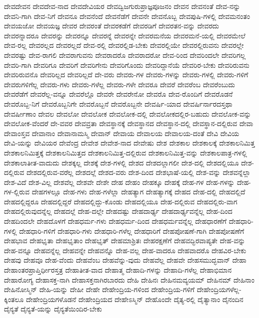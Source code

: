 {ದೇವದೇವನ
ದೇವದೇವ-ನಾದ
ದೇವದೇವಿಯರ
ದೇವದ್ವಿಜಗುರುಪ್ರಾಜ್ಞಪೂಜನಂ
ದೇವನ
ದೇವನಂತೆ
ದೇವ-ನನ್ನು
ದೇವನಿ-ಗಾಗಿ
ದೇವ-ನಿಗೆ
ದೇವನೂ
ದೇವನೆಂದೆ
ದೇವನೆಡೆಗೆ
ದೇವನೇ
ದೇವನೊಬ್ಬ
ದೇವಪುಷಿ-ಗಳಲ್ಲಿ
ದೇವಮನಂತಂ
ದೇವಯಜೋ
ದೇವಯಜ್ಞ
ದೇವರ
ದೇವರಂತೆ
ದೇವರಕಡೆಗೆ
ದೇವರಡಿಗೆ
ದೇವರತನ-ವನ್ನು
ದೇವರದು
ದೇವರನ್ನಾದರೂ
ದೇವರನ್ನು
ದೇವರನ್ನೂ
ದೇವರನ್ನೆ
ದೇವರನ್ನೇ
ದೇವರಮನೆಯ
ದೇವರಮನೆ-ಯಲ್ಲಿ
ದೇವರಮೇಲೆ
ದೇವ-ರಲ್ಲ
ದೇವರಲ್ಲದ
ದೇವರಲ್ಲದೆ
ದೇವ-ರಲ್ಲಿ
ದೇವರಲ್ಲಿಡ-ಬೇಕು
ದೇವರಲ್ಲಿಯೇ
ದೇವರಲ್ಲಿರುವನು
ದೇವರಲ್ಲೇ
ದೇವರಷ್ಟು
ದೇವ-ರಾಗಲಿ
ದೇವರಾಗುವನು
ದೇವರಾದರೊ
ದೇವರಾದರೋ
ದೇವ-ರಿಂದ
ದೇವರಿಂದಲೇ
ದೇವರಿಗಲ್ಲ
ದೇವರಿ-ಗಾಗಿ
ದೇವರಿಗೂ
ದೇವರಿಗೆ
ದೇವರಿಗೇನು
ದೇವರಿಗೊಂದು
ದೇವರಿದ್ದಾನೆಯೆ
ದೇವರಿರ-ಬೇಕು
ದೇವರಿರುವನು
ದೇವರಿರುವನೊ
ದೇವರಿಲ್ಲದ
ದೇವರಿಲ್ಲದೆ
ದೇ-ವರು
ದೇವರು-ಗಳ
ದೇವರು-ಗಳನ್ನು
ದೇವರು-ಗಳಲ್ಲಿ
ದೇವರು-ಗಳಿಗೆ
ದೇವರುಗಳಿಗೆಲ್ಲ
ದೇವರು-ಗಳು
ದೇವರು-ಗಳೆಲ್ಲ
ದೇವರು-ಗಳೇ
ದೇವರೂ
ದೇವರೆ
ದೇವರೆಂಬ
ದೇವರೆಂಬುದು
ದೇವರೆಡೆಗೆ
ದೇವರೆಲ್ಲ-ವನ್ನೂ
ದೇವರೆಲ್ಲೊ
ದೇವರೇ
ದೇವರೇನೋ
ದೇವರೊ
ದೇವ-ರೊಂದಿಗೆ
ದೇವರೊಡನೆ
ದೇವರೊಬ್ಬ-ನಿಗೆ
ದೇವರೊಬ್ಬನಿಗೇ
ದೇವರೊಬ್ಬನೆ
ದೇವರೊಬ್ಬನೇ
ದೇವರ್ಷಿ-ಯಾದ
ದೇವರ್ಷಿರ್ನಾರದಸ್ತಥಾ
ದೇವರ್ಷೀಣಾಂ
ದೇವಲ
ದೇವಲೋ
ದೇವಲೋಕ
ದೇವಲೋಕ-ದಲ್ಲಿ
ದೇವಲೋಕದಲ್ಲಿರ-ಬಹುದು
ದೇವಲೋಕ-ವನ್ನು
ದೇವಲೋಕ-ವೆಂದರೆ
ದೇ-ವವರ
ದೇವವ್ರತಾ
ದೇವಸ್ಥಾನಕ್ಕೆ
ದೇವಸ್ಥಾನದ
ದೇವಸ್ಥಾನ-ದಲ್ಲಿ
ದೇವಸ್ಥಾನ-ದಲ್ಲಿರುವ
ದೇವಾ
ದೇವಾಂಸ್ತವ
ದೇವಾನಾಂ
ದೇವಾನಾಮಸ್ಮಿ
ದೇವಾನ್
ದೇವಾಯ
ದೇವಾಲಯ
ದೇವಾಲಯ-ದಂತೆ
ದೇವಿ
ದೇವಿಯ
ದೇವಿ-ಯನ್ನು
ದೇವಿಯರ
ದೇವೆಂದ್ರ
ದೇವೇಶ
ದೇವೇಶ-ನಾದ
ದೇವೇಷು
ದೇಶ
ದೇಶಕಾಲ
ದೇಶಕಾಲಕ್ಕೆ
ದೇಶಕಾಲನಿಮಿತ್ತ
ದೇಶಕಾಲನಿಮಿತ್ತಕ್ಕೆ
ದೇಶಕಾಲನಿಮಿತ್ತದ
ದೇಶಕಾಲನಿಮಿತ್ತ-ದಲ್ಲಿರುವ
ದೇಶಕಾಲನಿಮಿತ್ತ-ವನ್ನು
ದೇಶಕಾಲಪಾತ್ರ-ಗಳಲ್ಲಿ
ದೇಶಕಾಲಾತೀತ-ವಾದುದು
ದೇಶಕ್ಕಲ್ಲ
ದೇಶಕ್ಕೆ
ದೇಶ-ಗಳಲ್ಲಿ
ದೇಶದ
ದೇಶದಲ್ಲಾಗಲೀ
ದೇಶ-ದಲ್ಲಿ
ದೇಶದಲ್ಲಿಯೂ
ದೇಶ-ದಲ್ಲಿರುವ
ದೇಶದಲ್ಲಿರುವ-ವರೆಲ್ಲ
ದೇಶದಲ್ಲೆ
ದೇಶದ-ವರು
ದೇಶ-ದಿಂದ
ದೇಶಭಾಷೆ-ಯಲ್ಲಿ
ದೇಶ-ವನ್ನು
ದೇಶವನ್ನೆಲ್ಲಾ
ದೇಶ-ವಿದೆ
ದೇಶ-ವಿಲ್ಲ
ದೇಶವೆಲ್ಲ
ದೇಶವೇ
ದೇಶೇ
ದೇಹ
ದೇಹಂ
ದೇಹಕ್ಕೂ
ದೇಹಕ್ಕೆ
ದೇಹ-ಗಳ
ದೇಹ-ಗಳನ್ನು
ದೇಹ-ಗಳ-ಲ್ಲಿರುವ
ದೇಹಗಳಲ್ಲೂ
ದೇಹ-ಗಳು
ದೇಹ-ಗಳೆಲ್ಲಾ
ದೇಹತ್ಯಾಗ
ದೇಹತ್ಯಾಗಕ್ಕೆ
ದೇಹದ
ದೇಹ-ದಲ್ಲಿ
ದೇಹದಲ್ಲಿದೆ
ದೇಹದಲ್ಲಿದ್ದರೂ
ದೇಹದಲ್ಲಿದ್ದರೆ
ದೇಹದಲ್ಲಿದ್ದು-ಕೊಂಡು
ದೇಹದಲ್ಲಿಯೂ
ದೇಹ-ದಲ್ಲಿರುವ
ದೇಹದಲ್ಲಿರು-ವಾಗ
ದೇಹದಲ್ಲಿರುವುದನ್ನೆಲ್ಲ
ದೇಹದಲ್ಲೆ
ದೇಹ-ದಲ್ಲೇ
ದೇಹದಷ್ಟು
ದೇಹದಾರ್ಢ್ಯ
ದೇಹದಾರ್ಢ್ಯವನ್ನೆಲ್ಲ
ದೇಹ-ದಿಂದ
ದೇಹದಿಂದಲೇ
ದೇಹದೊಳಗೆ
ದೇಹಧರ್ಮ-ಗಳು
ದೇಹಧರ್ಮ-ದಿಂದ
ದೇಹಧರ್ಮವನ್ನೆಲ್ಲ
ದೇಹಧಾರಣೆಗೆ
ದೇಹಧಾರಿ-ಗಳಲ್ಲಿ
ದೇಹಧಾರಿ-ಗಳಿಗೆ
ದೇಹಧಾರಿ-ಗಳು
ದೇಹಧಾರಿ-ಗಳೆಲ್ಲ
ದೇಹಧಾರಿಗೆ
ದೇಹಪೋಷಣೆ-ಗಾಗಿ
ದೇಹಪೋಷಣೆಗೆ
ದೇಹಭಾವ
ದೇಹಭೃತಾ
ದೇಹಭೃತಾಂ
ದೇಹಭೃತ್
ದೇಹಮಾಶ್ರಿತಃ
ದೇಹರಕ್ಷಣೆಗೆ
ದೇಹವದ್ಭಿರವಾಪ್ಯತೇ
ದೇಹ-ವನ್ನು
ದೇಹ-ವನ್ನೂ
ದೇಹವನ್ನೆಲ್ಲ
ದೇಹವನ್ನೇ
ದೇಹವನ್ನೊ
ದೇಹ-ವಲ್ಲ
ದೇಹ-ವಾದರೂ
ದೇಹವಾದರೊ
ದೇಹವಿರ-ಬೇಕು
ದೇಹವು
ದೇಹವೂ
ದೇಹ-ವೆಂದು
ದೇಹವೆಂಬ
ದೇಹವೆನ್ನು-ವುದು
ದೇಹವೆಲ್ಲ
ದೇಹವೇ
ದೇಹಸಮುದ್ಭವಾನ್
ದೇಹಾ
ದೇಹಾಂತರಪ್ರಾಪ್ತಿರ್ಧೀರಸ್ತತ್ರ
ದೇಹಾತೀತ-ವಾದ
ದೇಹಾತ್ಮ
ದೇಹಾದಿ-ಗಳನ್ನು
ದೇಹಾದಿ-ಗಳೆಲ್ಲ
ದೇಹಾಭಿಮಾನ
ದೇಹಾರೋಗ್ಯ
ದೇಹಾಸಕ್ತ-ನಾಗಿ
ದೇಹಾಸಕ್ತನಾಗಿರಬಾರದು
ದೇಹಿ
ದೇಹಿನಃ
ದೇಹಿನಮವ್ಯಯಮ್
ದೇಹಿನಮ್
ದೇಹಿನಾಂ
ದೇಹಿನೋಸ್ಮಿನ್
ದೇಹಿ-ಯನ್ನು
ದೇಹೀ
ದೇಹೇ
ದೇಹೇಂದ್ರಿಯ-ಗಳಿಂದ
ದೇಹೇಂದ್ರಿಯ-ಗಳಿಗೆ
ದೇಹೇಂದ್ರಿಯಗಳೆಲ್ಲ-ಕ್ಕಿಂತಲೂ
ದೇಹೇಂದ್ರಿಯಗಳೊಡನೆ
ದೇಹೇಂದ್ರಿಯದ
ದೇಹೇಽಸ್ಮಿನ್
ದೇಹೊಂದೇ
ದೈತ್ಯ-ರಲ್ಲಿ
ದೈತ್ಯಾನಾಂ
ದೈನಂದಿನ
ದೈನ್ಯತೆ
ದೈನ್ಯತೆ-ಯನ್ನು
ದೈನ್ಯತೆಯಿಂದಿರ-ಬೇಕು
}
